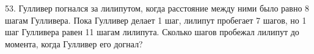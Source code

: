53. Гулливер погнался за лилипутом, когда расстояние между ними было равно 8 шагам Гулливера. Пока Гулливер делает 1 шаг, лилипут пробегает 7 шагов, но 1 шаг Гулливера равен 11 шагам лилипута. Сколько шагов пробежал лилипут до момента, когда Гулливер его догнал?\\
